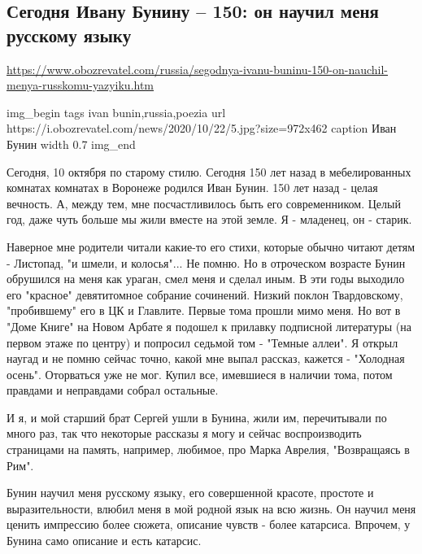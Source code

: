  
 

\subsection{Сегодня Ивану Бунину – 150: он научил меня русскому языку}

\url{https://www.obozrevatel.com/russia/segodnya-ivanu-buninu-150-on-nauchil-menya-russkomu-yazyiku.htm}

\ifcmt
img_begin 
	tags ivan bunin,russia,poezia
	url https://i.obozrevatel.com/news/2020/10/22/5.jpg?size=972x462
	caption Иван Бунин
	width 0.7
img_end
\fi

Сегодня, 10 октября по старому стилю. Сегодня 150 лет назад в мебелированных
комнатах комнатах в Воронеже родился Иван Бунин. 150 лет назад - целая
вечность. А, между тем, мне посчастливилось быть его современником. Целый год,
даже чуть больше мы жили вместе на этой земле. Я - младенец, он - старик.

Наверное мне родители читали какие-то его стихи, которые обычно читают детям -
Листопад, "и шмели, и колосья"... Не помню. Но в отроческом возрасте Бунин
обрушился на меня как ураган, смел меня и сделал иным. В эти годы выходило его
"красное" девятитомное собрание сочинений. Низкий поклон Твардовскому,
"пробившему" его в ЦК и Главлите. Первые тома прошли мимо меня. Но вот в "Доме
Книге" на Новом Арбате я подошел к прилавку подписной литературы (на первом
этаже по центру) и попросил седьмой том - "Темные аллеи". Я открыл наугад и не
помню сейчас точно, какой мне выпал рассказ, кажется - "Холодная осень".
Оторваться уже не мог. Купил все, имевшиеся в наличии тома, потом правдами и
неправдами собрал остальные.

И я, и мой старший брат Сергей ушли в Бунина, жили им, перечитывали по много
раз, так что некоторые рассказы я могу и сейчас воспроизводить страницами на
память, например, любимое, про Марка Аврелия, "Возвращаясь в Рим".

Бунин научил меня русскому языку, его совершенной красоте, простоте и
выразительности, влюбил меня в мой родной язык на всю жизнь. Он научил меня
ценить импрессию более сюжета, описание чувств - более катарсиса. Впрочем, у
Бунина само описание и есть катарсис.

